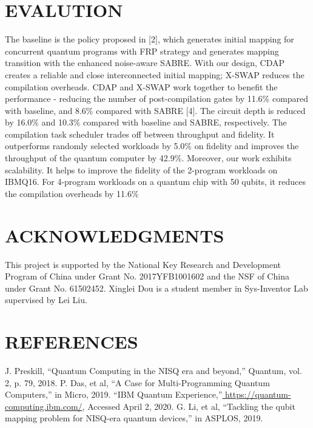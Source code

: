 \documentclass{article}
\begin{document}
		\section{EVALUTION}
			The baseline is the policy proposed in [2], which generates initial mapping for concurrent quantum programs with FRP strategy
			and generates mapping transition with the enhanced noise-aware
			SABRE. With our design, CDAP creates a reliable and close interconnected initial mapping; X-SWAP reduces the compilation overheads. CDAP and X-SWAP work together to benefit the performance - reducing the number of post-compilation gates by 11.6\%
			compared with baseline, and 8.6\% compared with SABRE [4]. The
			circuit depth is reduced by 16.0\% and 10.3\% compared with baseline
			and SABRE, respectively. The compilation task scheduler trades off
			between throughput and fidelity. It outperforms randomly selected
			workloads by 5.0\% on fidelity and improves the throughput of the
			quantum computer by 42.9\%. Moreover, our work exhibits scalability. It helps to improve the fidelity of the 2-program workloads
			on IBMQ16. For 4-program workloads on a quantum chip with 50
			qubits, it reduces the compilation overheads by 11.6\%
		
		\section*{ACKNOWLEDGMENTS}
			This project is supported by the National Key Research and Development Program of China under Grant No. 2017YFB1001602
			and the NSF of China under Grant No. 61502452. Xinglei Dou is a
			student member in Sys-Inventor Lab supervised by Lei Liu.
		
		\section*{REFERENCES}
			\begin{thebibliography}{9}
				J. Preskill, “Quantum Computing in the NISQ era and beyond,” Quantum, vol. 2, p.
				79, 2018.
				P. Das, et al, “A Case for Multi-Programming Quantum Computers,” in Micro,
				2019.
				“IBM Quantum Experience,”\url{ https://quantum-computing.ibm.com/}, Accessed April
				2, 2020.
				G. Li, et al, “Tackling the qubit mapping problem for NISQ-era quantum devices,”
				in ASPLOS, 2019.
			\end{thebibliography}
\end{document}
